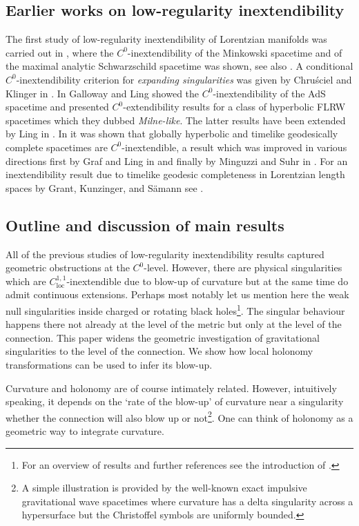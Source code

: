 \documentclass[reqno]{article}
\newcommand{\loc}{\mathrm{loc}}
\begin{document}
\subsection{Earlier works on low-regularity inextendibility}

The first study of low-regularity inextendibility of Lorentzian manifolds was carried out in \cite{Sbie15}, where the $C^0$-inextendibility of the Minkowski spacetime and of the maximal analytic Schwarzschild spacetime was shown, see also \cite{Sbie18}. A conditional $C^0$-inextendibility criterion for \emph{expanding singularities} was given by Chru\'sciel and Klinger in \cite{ChrusKli12}.  In \cite{GalLin16} Galloway and Ling showed the $C^0$-inextendibility of the AdS spacetime and presented $C^0$-extendibility results for a class of hyperbolic FLRW spacetimes which they dubbed \emph{Milne-like}. The latter results have been extended by Ling in \cite{Ling20}. In \cite{GalLinSbi17} it was shown that globally hyperbolic and timelike geodesically complete spacetimes are $C^0$-inextendible, a result which was improved in various directions first by Graf and Ling in \cite{GrafLing18} and finally by Minguzzi and Suhr in \cite{MinSuhr19}. For an inextendibility result due to timelike geodesic completeness in Lorentzian length spaces by Grant, Kunzinger, and S\"amann see \cite{GraKuSa19}.


\subsection{Outline and discussion of main results}

All of the previous studies of low-regularity inextendibility results captured geometric obstructions at the $C^0$-level. However, there are physical singularities which are $C^{1,1}_{\loc}$-inextendible due to blow-up of curvature but at the same time do admit continuous extensions. Perhaps most notably let us mention here the weak null singularities inside charged or rotating black holes\footnote{For an overview of results and further references see the introduction of \cite{LukOh19I}.}. The singular behaviour happens there not already at the level of the metric but only at the level of the connection.  This paper widens the geometric investigation of gravitational singularities to the level of the connection. We show how local holonomy transformations can be used to infer its blow-up. 

Curvature and holonomy are of course intimately related. However, intuitively speaking, it depends on the `rate of the blow-up' of curvature near a singularity whether the connection will also blow up or not\footnote{A simple illustration is provided by the well-known exact impulsive gravitational wave spacetimes \cite{Pen72} where curvature has a delta singularity across a hypersurface but the Christoffel symbols are uniformly bounded.}. One can think of holonomy as a geometric way to integrate curvature.
\newline
\end{document}
